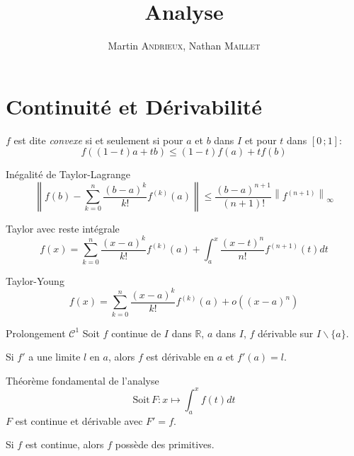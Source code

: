 \documentclass[french, a4paper, 10pt, twocolumn]{article}
\title{Analyse}
\author{Martin \textsc{Andrieux}, Nathan \textsc{Maillet}}
\date{}
\newcommand{\ssi}{si et seulement si\xspace}		%
\newcommand{\R}{\mathbb{R}}   %
\newcommand{\po}{\left(}         %
\newcommand{\pf}{\right)}        %
\newcommand{\pof}[1]{\po #1 \pf} %
\newcommand{\interff}[2]{\left[#1\,;#2\right]}   %
\begin{document}
\maketitle

\section{Continuité et Dérivabilité}
\begin{definition}
  \(f\) est dite \emph{convexe} \ssi pour \(a\) et \(b\) dans \(I\) et pour \(t\) dans \(\interff{0}{1}\):
  \[f((1-t)a+tb)\leqslant (1-t)f(a)+tf(b)\]
\end{definition}

\begin{theoreme}{Inégalité de Taylor-Lagrange}
  \[\left\lVert f(b)-\sum_{k=0}^{n}\dfrac{\pof{b-a}^{k}}{k!}f^{(k)}(a)\right\rVert \leqslant\dfrac{\pof{b-a}^{n+1}}{(n+1)!}\left\lVert f^{(n+1)}\right\rVert_{\infty}\]
\end{theoreme}

\begin{theoreme}{Taylor avec reste intégrale}
\[f(x)=\sum_{k=0}^{n}\dfrac{\pof{x-a}^{k}}{k!}f^{(k)}(a)+\int_{a}^{x}\dfrac{\pof{x-t}^{n}}{n!}f^{(n+1)}(t)dt\]
\end{theoreme}

\begin{theoreme}{Taylor-Young}
\[f(x)=\sum_{k=0}^{n}\dfrac{\pof{x-a}^{k}}{k!}f^{(k)}(a)+o\pof{(x-a)^{n}}\]
\end{theoreme}

\begin{theoreme}{Prolongement \(\mathcal C^{1}\)}
  Soit \(f\) continue de \(I\) dans \(\R\), \(a\) dans \(I\), \(f\) dérivable sur \(I\backslash \lbrace a\rbrace\).

  Si \(f'\) a une limite \(l\) en \(a\), alors \(f\) est dérivable en \(a\) et \(f'(a)=l\).
\end{theoreme}

\begin{theoreme}{Théorème fondamental de l'analyse}
  \[\mathrm{Soit \,} F : x\mapsto \int_{a}^{x}f(t)dt\]
  \(F\) est continue et dérivable avec \(F'=f\).

  Si \(f\) est continue, alors \(f\) possède des primitives.
\end{theoreme}
\end{document}
